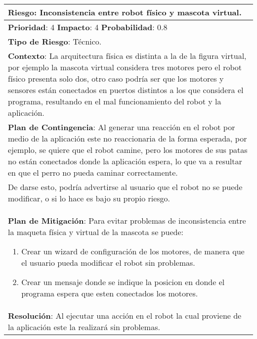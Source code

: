 \begin{table}[H]
  \centering
  \begin{tabular}{|p{15cm}|}\hline
    {\bf Riesgo}: Inconsistencia entre robot físico y mascota virtual.\\\hline
    {\bf Prioridad}: 4  {\bf Impacto}: 4  {\bf Probabilidad}: 0.8\\\hline
    {\bf Tipo de Riesgo}: Técnico.\\\hline
    {\bf Contexto}: La arquitectura física es distinta a la de la figura virtual, por ejemplo la mascota virtual considera tres motores pero el robot físico presenta solo dos, otro caso podría ser que los motores y sensores están conectados en puertos distintos a los que considera el programa, resultando en el mal funcionamiento del robot y la aplicación.\\\hline
    {\bf Plan de Contingencia}: Al generar una reacción en el robot por medio de la aplicación este no reaccionaria de la forma esperada, por ejemplo, se quiere que el robot camine, pero los motores de sus patas no están conectados donde la aplicación espera, lo que va a resultar en que el perro no pueda caminar correctamente.\\De darse esto, podría advertirse al usuario que el robot no se puede modificar, o si lo hace es bajo su propio riesgo.\\\hline
    {\bf Plan de Mitigación}: Para evitar problemas de inconsistencia entre la maqueta física y virtual de la mascota se puede:\begin{enumerate}\item Crear un wizard de configuración de los motores, de manera que el usuario pueda modificar el robot sin problemas.\item Crear un mensaje donde se indique la posicion en donde el programa espera que esten conectados los motores.\end{enumerate}\\\hline
    {\bf Resolución}: Al ejecutar una acción en el robot la cual proviene de la aplicación este la realizará sin problemas.\\\hline
  \end{tabular}
  \label{table:R3}
\end{table}


